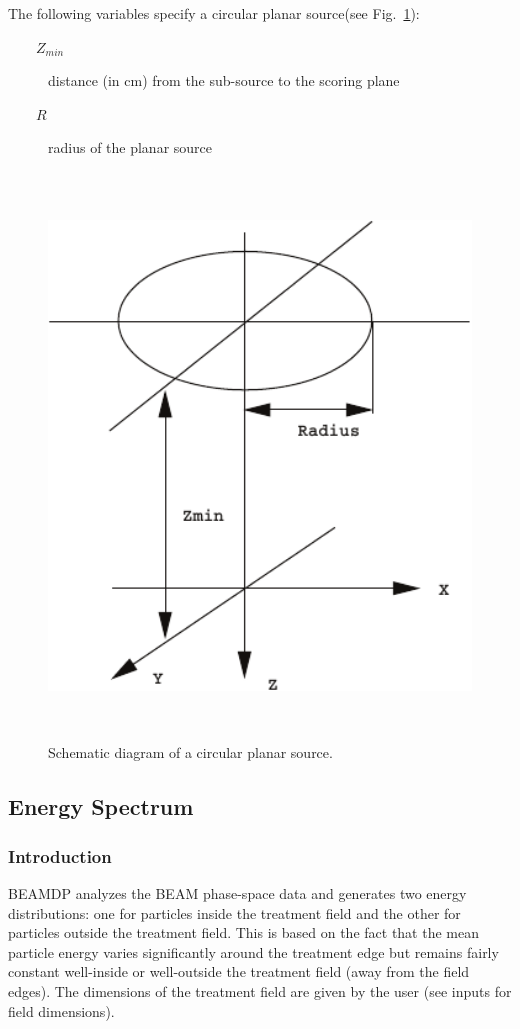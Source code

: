 \documentclass[12pt,twoside]{article}
\begin{document}
The following variables specify a circular planar  source(see Fig.~\ref{source5}):

\begin{description}
\item [~~~~$Z_{min}$] distance (in cm) from the sub-source to the scoring plane
\item [~~~~$R$] radius of the planar source

\end{description}

\begin{figure}[htbp]
\begin{center}
\leavevmode
\mbox{}\hspace{0cm}
\includegraphics[height=15cm]{figures/source5}
\caption[]
{Schematic diagram of a circular planar source. }
\label{source5}
\end{center}
\end{figure}
\subsection{Energy Spectrum}
\subsubsection{Introduction}
BEAMDP analyzes the BEAM phase-space data and generates two energy distributions: one for particles inside the treatment field and the other for particles outside the treatment field. This is based on the fact that the mean particle energy varies significantly around the treatment edge but remains fairly constant well-inside or well-outside the treatment field (away from the field edges). The dimensions of the treatment field are given by the user (see inputs for field dimensions).
\end{document}
